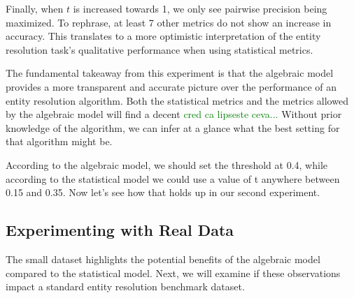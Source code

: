 \documentclass[11pt]{article}
\begin{document}
    Finally, when $t$ is increased towards 1, we only see pairwise precision
    being maximized.
    To rephrase, at least 7 other metrics do not show an increase in accuracy.
    This translates to a more optimistic interpretation of the entity resolution
    task's qualitative performance when using statistical metrics.

    The fundamental takeaway from this experiment is that the algebraic model
    provides a more transparent and accurate picture over the performance of an
    entity resolution algorithm.
    Both the statistical metrics and the metrics allowed by the algebraic model
    will find a decent 
    \textcolor{green}{cred ca lipseste ceva...} 
    Without prior knowledge of the algorithm, we can infer at a glance what the
    best setting for that algorithm might be.
    
    According to the algebraic model, we should set the threshold at 0.4, while
    according to the statistical model we could use a value of t anywhere
    between 0.15 and 0.35.
    Now let's see how that holds up in our second experiment.
       

    \subsection{Experimenting with Real Data}

    The small dataset highlights the potential benefits of the algebraic model
    compared to the statistical model.
    Next, we will examine if these observations impact a standard entity
    resolution benchmark dataset.
\end{document}
